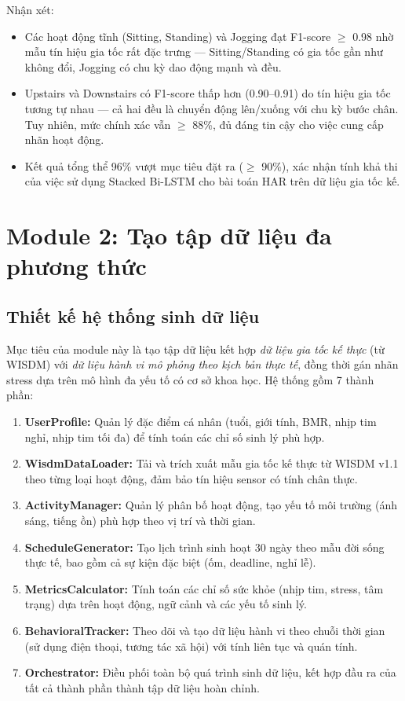 Nhận xét:
\begin{itemize}
    \item Các hoạt động tĩnh (Sitting, Standing) và Jogging đạt F1-score $\geq$ 0.98 nhờ mẫu tín hiệu gia tốc rất đặc trưng — Sitting/Standing có gia tốc gần như không đổi, Jogging có chu kỳ dao động mạnh và đều.
    \item Upstairs và Downstairs có F1-score thấp hơn (0.90--0.91) do tín hiệu gia tốc tương tự nhau — cả hai đều là chuyển động lên/xuống với chu kỳ bước chân. Tuy nhiên, mức chính xác vẫn $\geq$ 88\%, đủ đáng tin cậy cho việc cung cấp nhãn hoạt động.
    \item Kết quả tổng thể 96\% vượt mục tiêu đặt ra ($\geq$ 90\%), xác nhận tính khả thi của việc sử dụng Stacked Bi-LSTM cho bài toán HAR trên dữ liệu gia tốc kế.
\end{itemize}


\section{Module 2: Tạo tập dữ liệu đa phương thức}
\label{sec:data_generation}

\subsection{Thiết kế hệ thống sinh dữ liệu}
\label{subsec:data_gen_design}

Mục tiêu của module này là tạo tập dữ liệu kết hợp \textit{dữ liệu gia tốc kế thực} (từ WISDM) với \textit{dữ liệu hành vi mô phỏng theo kịch bản thực tế}, đồng thời gán nhãn stress dựa trên mô hình đa yếu tố có cơ sở khoa học. Hệ thống gồm 7 thành phần:

\begin{enumerate}
    \item \textbf{UserProfile:} Quản lý đặc điểm cá nhân (tuổi, giới tính, BMR, nhịp tim nghỉ, nhịp tim tối đa) để tính toán các chỉ số sinh lý phù hợp.
    \item \textbf{WisdmDataLoader:} Tải và trích xuất mẫu gia tốc kế thực từ WISDM v1.1 theo từng loại hoạt động, đảm bảo tín hiệu sensor có tính chân thực.
    \item \textbf{ActivityManager:} Quản lý phân bố hoạt động, tạo yếu tố môi trường (ánh sáng, tiếng ồn) phù hợp theo vị trí và thời gian.
    \item \textbf{ScheduleGenerator:} Tạo lịch trình sinh hoạt 30 ngày theo mẫu đời sống thực tế, bao gồm cả sự kiện đặc biệt (ốm, deadline, nghỉ lễ).
    \item \textbf{MetricsCalculator:} Tính toán các chỉ số sức khỏe (nhịp tim, stress, tâm trạng) dựa trên hoạt động, ngữ cảnh và các yếu tố sinh lý.
    \item \textbf{BehavioralTracker:} Theo dõi và tạo dữ liệu hành vi theo chuỗi thời gian (sử dụng điện thoại, tương tác xã hội) với tính liên tục và quán tính.
    \item \textbf{Orchestrator:} Điều phối toàn bộ quá trình sinh dữ liệu, kết hợp đầu ra của tất cả thành phần thành tập dữ liệu hoàn chỉnh.
\end{enumerate}

